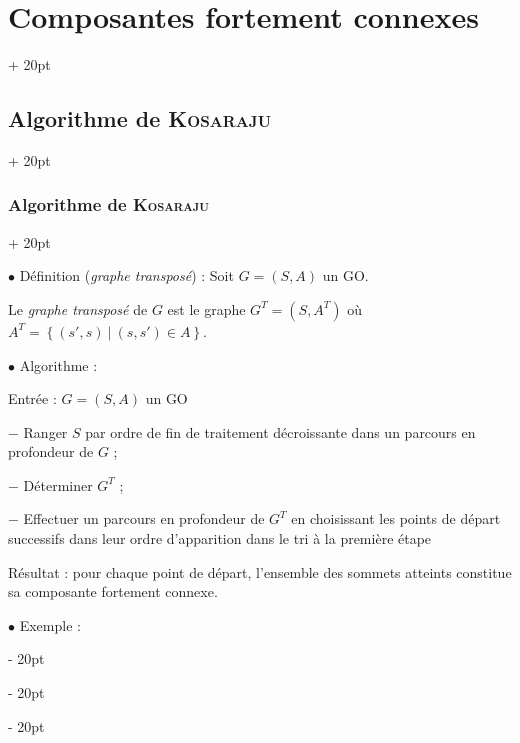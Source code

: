 \documentclass[a4paper, 12pt, twoside]{article}
\newcommand{\set}[1]{\left\{ #1 \right\}}
\newcommand{\ind}[1][20pt]{\advance\leftskip + #1}
\newcommand{\deind}[1][20pt]{\advance\leftskip - #1}
\newenvironment{indt}[2][20pt]{#2 \par \ind[#1]}{\par \deind} %
\begin{document}
\begin{indt}{\section{Composantes fortement connexes}}
\begin{indt}{\subsection{Algorithme de \textsc{Kosaraju}}}
\begin{indt}{\subsubsection{Algorithme de \textsc{Kosaraju}}}
                \vspace{12pt}
                
                $\bullet$ Définition (\textit{graphe transposé}) :
                Soit $G = (S, A)$ un GO.

                Le \textit{graphe transposé} de $G$ est le graphe $G^T = (S, A^T)$
                où $A^T = \set{(s', s)\ |\ (s, s') \in A}$.

                \vspace{12pt}
                
                $\bullet$ Algorithme :

                Entrée : $G = (S, A)$ un GO

                \begin{pseudocode}
                    $-$ Ranger $S$ par ordre de fin de traitement décroissante dans un parcours en profondeur de $G$ ;

                    $-$ Déterminer $G^T$ ;

                    $-$ Effectuer un parcours en profondeur de $G^T$ en choisissant les points de départ successifs dans leur ordre d'apparition dans le tri à la première étape
                \end{pseudocode}

                Résultat : pour chaque point de départ, l'ensemble des sommets atteints constitue sa composante fortement connexe.

                \vspace{12pt}
                
                $\bullet$ Exemple :
                \begin{center}
\end{center}
\end{indt}
\end{indt}
\end{indt}
\end{document}
